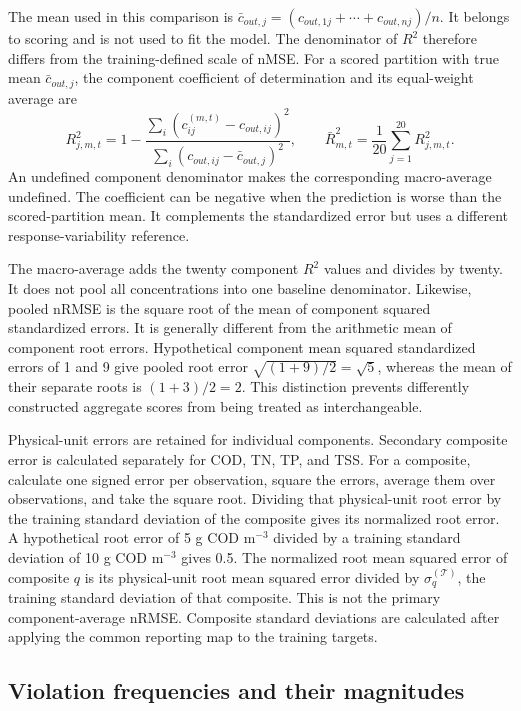 The mean used in this comparison is $\bar c_{out,j}=(c_{out,1j}+\cdots+c_{out,nj})/n$. It belongs to scoring and is not used to fit the model. The denominator of $R^2$ therefore differs from the training-defined scale of nMSE. For a scored partition with true mean $\bar c_{out,j}$, the component coefficient of determination and its equal-weight average are
\begin{equation}
R_{j,m,t}^2=1-
\frac{\sum_i(c_{ij}^{(m,t)}-c_{out,ij})^2}
{\sum_i(c_{out,ij}-\bar c_{out,j})^2},\qquad
\bar R_{m,t}^2=\frac{1}{20}\sum_{j=1}^{20}R_{j,m,t}^2.
\label{eq:projection_r_squared}
\end{equation}
An undefined component denominator makes the corresponding macro-average undefined. The coefficient can be negative when the prediction is worse than the scored-partition mean. It complements the standardized error but uses a different response-variability reference.

The macro-average adds the twenty component $R^2$ values and divides by twenty. It does not pool all concentrations into one baseline denominator. Likewise, pooled nRMSE is the square root of the mean of component squared standardized errors. It is generally different from the arithmetic mean of component root errors. Hypothetical component mean squared standardized errors of 1 and 9 give pooled root error $\sqrt{(1+9)/2}=\sqrt5$, whereas the mean of their separate roots is $(1+3)/2=2$. This distinction prevents differently constructed aggregate scores from being treated as interchangeable.

Physical-unit errors are retained for individual components. Secondary composite error is calculated separately for COD, TN, TP, and TSS. For a composite, calculate one signed error per observation, square the errors, average them over observations, and take the square root. Dividing that physical-unit root error by the training standard deviation of the composite gives its normalized root error. A hypothetical root error of 5 g COD m$^{-3}$ divided by a training standard deviation of 10 g COD m$^{-3}$ gives 0.5. The normalized root mean squared error of composite $q$ is its physical-unit root mean squared error divided by $\sigma_q^{(\mathcal{T})}$, the training standard deviation of that composite. This is not the primary component-average nRMSE. Composite standard deviations are calculated after applying the common reporting map to the training targets.

\subsection{Violation frequencies and their magnitudes}

